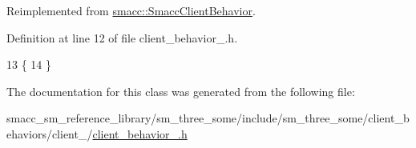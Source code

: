 Reimplemented from \hyperlink{classsmacc_1_1SmaccClientBehavior_a7962382f93987c720ad432fef55b123f}{smacc\+::\+Smacc\+Client\+Behavior}.



Definition at line 12 of file client\+\_\+behavior\+\_.\+h.


\begin{DoxyCode}
13     \{
14     \}
\end{DoxyCode}


The documentation for this class was generated from the following file\+:\begin{DoxyCompactItemize}
\item 
smacc\+\_\+sm\+\_\+reference\+\_\+library/sm\+\_\+three\+\_\+some/include/sm\+\_\+three\+\_\+some/client\+\_\+behaviors/client\+\_/\hyperlink{client__behavior__2_8h}{client\+\_\+behavior\+\_.\+h}\end{DoxyCompactItemize}
